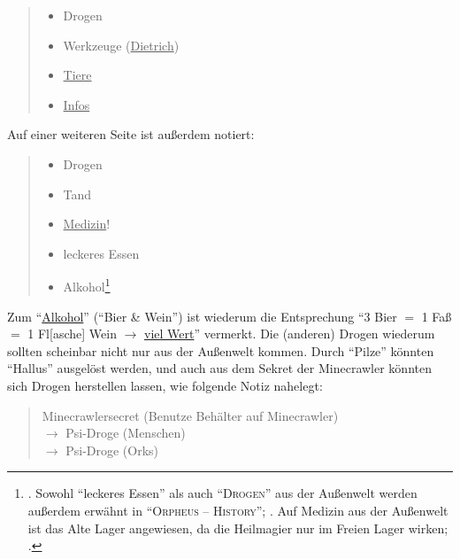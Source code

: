 \documentclass[a5paper,pagesize,numbers=noenddot]{scrbook}
\begin{document}
\begin{quote}
   \begin{itemize}
      \item[--] Drogen
      \item[--] Werkzeuge (\uline{Dietrich})
      \item[--] \uline{Tiere}
      \item[--] \uline{Infos}\autocite[S.~6]{orpheus_b_scribbles}
   \end{itemize}
\end{quote}

\noindent Auf einer weiteren Seite ist außerdem notiert:

\begin{quote}
   \begin{itemize}
      \item[--] Drogen
      \item[--] Tand
      \item[--] \uline{Medizin}!
      \item[--] leckeres Essen
      \item[--] Alkohol\footnote{\autocite[S.~13]{orpheus_b_scribbles}. Sowohl \enquote{leckeres Essen} als auch \enquote{\textsc{Drogen}} aus der Außenwelt werden außerdem erwähnt in \enquote{\textsc{Orpheus -- History}}; \autocite[S.~2]{orpheus_b_scribbles}. Auf Medizin aus der Außenwelt ist das Alte Lager angewiesen, da die Heilmagier nur im Freien Lager wirken; \autocite[vgl.][S.~7]{orpheus_gildensystem}.}
   \end{itemize}
\end{quote}

\noindent Zum \enquote{\uline{Alkohol}} (\enquote{Bier \& Wein}) ist wiederum die Entsprechung \enquote{3 Bier $=$ 1 Faß $=$ 1 Fl[asche] Wein $\rightarrow$ \uline{viel Wert}} vermerkt.\autocite[S.~6]{orpheus_b_scribbles}
Die (anderen) Drogen wiederum sollten scheinbar nicht nur aus der Außenwelt kommen.
Durch \enquote{Pilze} könnten \enquote{Hallus} ausgelöst werden, und auch aus dem Sekret der Minecrawler könnten sich Drogen herstellen lassen, wie folgende Notiz nahelegt:

\begin{quote}
   Minecrawlersecret (Benutze Behälter auf Minecrawler)\\
   $\rightarrow$ Psi-Droge (Menschen)\\
   $\rightarrow$ Psi-Droge (Orks)\autocite[S.~6]{orpheus_b_scribbles}
\end{quote}


\end{document}
